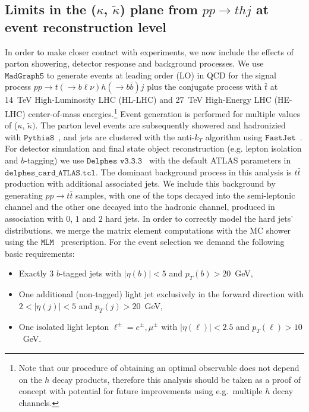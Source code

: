 \documentclass[11pt,a4paper]{article}
\begin{document}
\subsection{Limits in the ($\kappa$, $\tilde{\kappa}$) plane from $pp\to thj$ at event reconstruction level}

In order to make closer contact with experiments, we now include the effects of parton showering, detector response and background processes. We use $\texttt{MadGraph5}$ to generate events at leading order (LO) in QCD for the signal process $p p \to t (\to b \ell \nu) h (\to b \bar{b}) j$ plus the conjugate process with $\bar t$ at  14~TeV High-Luminosity LHC (HL-LHC) and 27~TeV High-Energy LHC (HE-LHC) center-of-mass energies.\footnote{Note that our procedure of obtaining an optimal observable does not depend on the $h$ decay products, therefore this analysis should be taken as a proof of concept with potential for future improvements using e.g.~multiple $h$ decay channels.} Event generation is performed for multiple values of ($\kappa$, $\tilde{\kappa})$. The parton level events are subsequently showered and hadronizied with $\texttt{Pythia8}$~\cite{Sjostrand:2007gs}, and jets are clustered with the anti-$k_T$ algorithm using $\texttt{FastJet}$~\cite{Cacciari:2011ma}. For detector simulation and final state object reconstruction (e.g. lepton isolation and $b$-tagging) we use $\texttt{Delphes v3.3.3}$~\cite{deFavereau:2013fsa} with the default ATLAS parameters in $\texttt{delphes\_card\_ATLAS.tcl}$. The dominant background process in this analysis is $t\bar t$ production with additional associated jets. We include this background by generating $pp\to t\bar t$ samples, with one of the tops decayed into the semi-leptonic channel and the other one decayed into the hadronic channel, produced in association with $0$, $1$ and $2$ hard jets. In order to correctly model the hard jets' distributions, we merge the matrix element computations with the MC shower using the $\texttt{MLM}$~\cite{Mangano:2006rw} prescription. 
For the event selection we demand the following basic requirements:
\begin{itemize}
\item Exactly $3$ $b$-tagged jets with $|\eta(b)|<5$ and $p_T(b)>20$~GeV,
\item One additional (non-tagged) light jet exclusively in the forward direction with $2<|\eta(j)|<5$ and $p_T(j)>20$~GeV,
\item One isolated light lepton $\ell^\pm=e^\pm,\mu^\pm$ with $|\eta(\ell)|<2.5$ and $p_T(\ell)>10$~GeV.  
\end{itemize}
\end{document}

